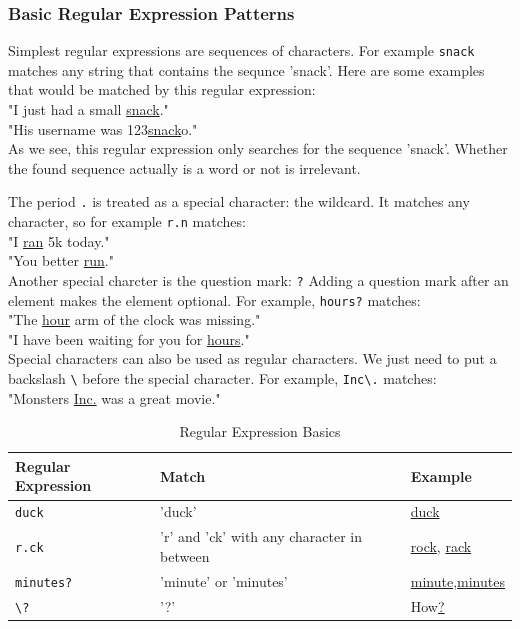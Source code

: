\subsubsection{Basic Regular Expression Patterns}
Simplest regular expressions are sequences of characters. 
For example \texttt{snack} matches any string that contains the sequnce 'snack'. 
Here are some examples that would be matched by this regular expression:\\
"I just had a small \underline{snack}."\\
"His username was 123\underline{snack}o."\\
As we see, this regular expression only searches for the sequence 'snack'.
Whether the found sequence actually is a word or not is irrelevant.

The period \texttt{.} is treated as a special character: the wildcard.
It matches any character, so for example \texttt{r.n} matches:\\
"I \underline{ran} 5k today."\\
"You better \underline{run}."\\
Another special charcter is the question mark: \texttt{?}
Adding a question mark after an element makes the element optional. 
For example, \texttt{hours?} matches:\\
"The \underline{hour} arm of the clock was missing."\\
"I have been waiting for you for \underline{hours}."\\
Special characters can also be used as regular characters.  
We just need to put a backslash \texttt{\textbackslash} before the special character.
For example, \texttt{Inc\textbackslash.} matches:\\
"Monsters \underline{Inc.} was a great movie."

\begin{table}[htbp]
  \caption[Regular Expression Basics]{Regular Expression Basics}\label{tab:re_basic}		
  \centering
  \begin{tabular}{l l l}
    Regular Expression&Match&Example\\ \toprule
    \texttt{duck}&'duck'&\underline{duck}\\ \hline
    \texttt{r.ck}&'r' and 'ck' with any character in between&\underline{rock}, \underline{rack}\\ \hline
    \texttt{minutes?}&'minute' or 'minutes'&\underline{minute},\underline{minutes}\\ \hline
    \texttt{\textbackslash?}&'?'&How\underline{?}\\ \hline
  \end{tabular}
\end{table}

